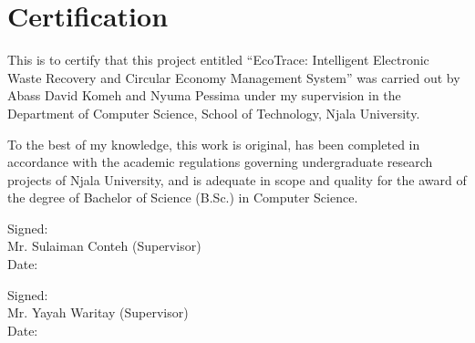 \chapter*{Certification}

This is to certify that this project entitled ``EcoTrace: Intelligent Electronic Waste
Recovery and Circular Economy Management System'' was carried out by Abass
David Komeh and Nyuma Pessima under my supervision in the Department of Computer
Science, School of Technology, Njala University.

To the best of my knowledge, this work is original, has been completed in accordance
with the academic regulations governing undergraduate research projects of
Njala University, and is adequate in scope and quality for the award of the degree of
Bachelor of Science (B.Sc.) in Computer Science.

\vspace{1.5cm}
\noindent Signed: \underline{\hspace{6cm}}\\[0.4cm]
Mr. Sulaiman Conteh (Supervisor)\\[0.4cm]
Date: \underline{\hspace{6cm}}

\vspace{1.5cm}
\noindent Signed: \underline{\hspace{6cm}}\\[0.4cm]
Mr. Yayah Waritay (Supervisor)\\[0.4cm]
Date: \underline{\hspace{6cm}}
